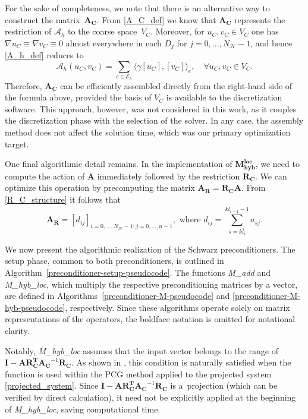 \documentclass[11pt]{article}
\theoremstyle{definition}
\theoremstyle{theorem}
\begin{document}
For the sake of completeness, we note that there is an alternative way to
construct the matrix~$\bm{A_C}$. From \eqref{A_C_def} we know that $\bm{A_C}$
represents the restriction of $\mathcal{A}_h$ to the coarse
space~$V_C$. Moreover, for $u_C, v_C\in V_C$ one has
$\nabla u_C \equiv \nabla v_C\equiv0$ almost everywhere in each $D_j$ for
$j=0,...,N_{\mathcal{H}}-1$, and hence \eqref{A_h_def} reduces to
\[
\mathcal{A}_h(u_C, v_C)= \sum_{e\in \mathcal{E}_h} \langle \gamma [u_C], [v_C]\rangle_e,
\quad \forall u_C, v_C\in V_C.
\]
Therefore, $\bm{A_C}$ can be efficiently assembled directly from the
right-hand side of the formula above, provided the
basis of $V_C$ is available to the discretization software. This approach,
however, was not considered in this work, as it couples the discretization phase
with the selection of the solver. In any case,
the assembly method does not affect the solution time, which was our primary
optimization target.

One final algorithmic detail remains. In the implementation of
$\bm{M_{hyb}^{loc}}$, we need to compute the action of $\bm{A}$ immediately
followed by the restriction $\bm{R_C}$. We can optimize this operation by
precomputing the matrix $\bm{A_R} = \bm{R_C}\bm{A}$. From \eqref{R_C_structure}
it follows that
\begin{equation}
  \bm{A_R} = \left[d_{ij}\right]_{i=0,...,N_{\mathcal{H}}-1; j=0,...,n-1},
  \text{ where } d_{ij} = \sum_{s=k\bar l_{i}}^{k\bar l_{i+1}-1} a_{sj}.
  \label{A_R_structure}
\end{equation}

We now present the algorithmic realization of the Schwarz preconditioners.
The setup phase, common to both preconditioners, is outlined in
Algorithm~\ref{preconditioner-setup-pseudocode}. The functions \textit{M\_{add}}
and \textit{M\_{hyb}\_{loc}}, which multiply the respective preconditioning matrices
by a vector, are defined in Algorithms~\ref{preconditioner-M-pseudocode}
and \ref{preconditioner-M-hyb-pseudocode}, respectively.
Since these algorithms operate solely on matrix representations of the operators,
the boldface notation is omitted for notational clarity.

Notably, \textit{M\_{hyb}\_{loc}} assumes that the
input vector belongs to the range of $\bm{I} - \bm{A}\bm{R_C^T} \bm{A_C}^{-1} \bm{R_C}$.
As shown in \cite{toselli}, this condition is naturally satisfied
when the function is used within the PCG method applied to the projected system
\eqref{projected_system}.
Since $\bm{I} - \bm{A}\bm{R_C^T} \bm{A_C}^{-1} \bm{R_C}$ is a~projection (which
can be verified by direct calculation), it need not be explicitly applied at
the beginning of \textit{M\_{hyb}\_{loc}}, saving computational time.
\end{document}
